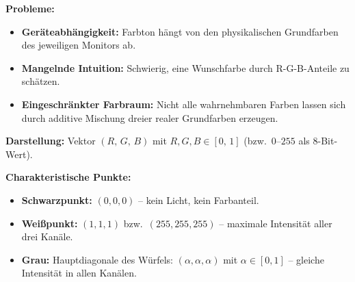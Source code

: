 \documentclass[12pt, a4paper]{article}
\begin{document}
\textbf{Probleme:}
\begin{itemize}
  \item \textbf{Geräteabhängigkeit:} Farbton hängt von den physikalischen
        Grundfarben des jeweiligen Monitors ab.
  \item \textbf{Mangelnde Intuition:} Schwierig, eine Wunschfarbe durch
        R-G-B-Anteile zu schätzen.
  \item \textbf{Eingeschränkter Farbraum:} Nicht alle wahrnehmbaren Farben
        lassen sich durch additive Mischung dreier realer Grundfarben erzeugen.
\end{itemize}

\textbf{Darstellung:} Vektor $(R,\,G,\,B)$ mit $R,G,B \in [0,\,1]$
(bzw.\ $0$--$255$ als 8-Bit-Wert).

\textbf{Charakteristische Punkte:}
\begin{itemize}
  \item \textbf{Schwarzpunkt:} $(0,0,0)$ -- kein Licht, kein Farbanteil.
  \item \textbf{Weißpunkt:} $(1,1,1)$ bzw.\ $(255,255,255)$ -- maximale
        Intensität aller drei Kanäle.
  \item \textbf{Grau:} Hauptdiagonale des Würfels:
        $(\alpha,\alpha,\alpha)$ mit $\alpha \in [0,1]$ --
        gleiche Intensität in allen Kanälen.
\end{itemize}
\end{document}
